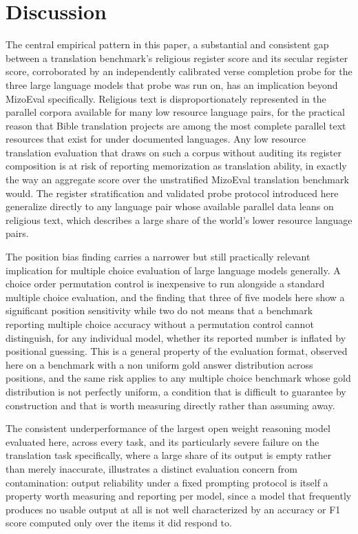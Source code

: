 \documentclass[11pt,a4paper]{article}
\begin{document}
\section{Discussion}
\label{sec:discussion}

The central empirical pattern in this paper, a substantial and consistent gap between a translation benchmark's religious register score and its secular register score, corroborated by an independently calibrated verse completion probe for the three large language models that probe was run on, has an implication beyond MizoEval specifically. Religious text is disproportionately represented in the parallel corpora available for many low resource language pairs, for the practical reason that Bible translation projects are among the most complete parallel text resources that exist for under documented languages. Any low resource translation evaluation that draws on such a corpus without auditing its register composition is at risk of reporting memorization as translation ability, in exactly the way an aggregate score over the unstratified MizoEval translation benchmark would. The register stratification and validated probe protocol introduced here generalize directly to any language pair whose available parallel data leans on religious text, which describes a large share of the world's lower resource language pairs.

The position bias finding carries a narrower but still practically relevant implication for multiple choice evaluation of large language models generally. A choice order permutation control is inexpensive to run alongside a standard multiple choice evaluation, and the finding that three of five models here show a significant position sensitivity while two do not means that a benchmark reporting multiple choice accuracy without a permutation control cannot distinguish, for any individual model, whether its reported number is inflated by positional guessing. This is a general property of the evaluation format, observed here on a benchmark with a non uniform gold answer distribution across positions, and the same risk applies to any multiple choice benchmark whose gold distribution is not perfectly uniform, a condition that is difficult to guarantee by construction and that is worth measuring directly rather than assuming away.

The consistent underperformance of the largest open weight reasoning model evaluated here, across every task, and its particularly severe failure on the translation task specifically, where a large share of its output is empty rather than merely inaccurate, illustrates a distinct evaluation concern from contamination: output reliability under a fixed prompting protocol is itself a property worth measuring and reporting per model, since a model that frequently produces no usable output at all is not well characterized by an accuracy or F1 score computed only over the items it did respond to.
\end{document}
